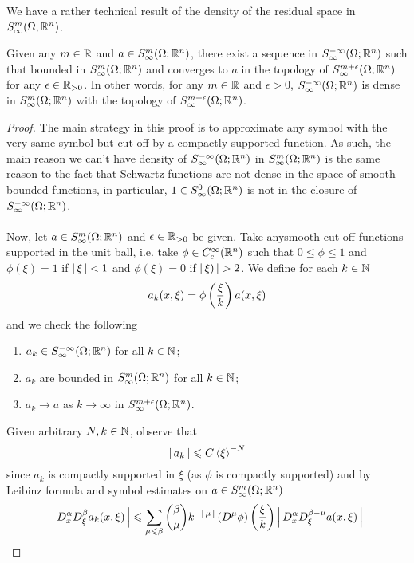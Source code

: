 \documentclass[12pt]{article}
\begin{document}
We have a rather technical result of the density of the residual space in $S^{m}_\infty(\Omega; \R^n)$. 
\begin{flemma}
    Given any $m \in \R$ and $a \in S^{m}_\infty(\Omega; \R^n)$, there exist a sequence in $S^{-\infty}_\infty(\Omega; \R^n)$ such that bounded in $S^{m}_\infty(\Omega; \R^n)$ and converges to $a$ in the topology of $S^{m + \epsilon}_\infty(\Omega; \R^n)$ for any $\epsilon \in \R_{> 0}$. In other words, for any $m \in \R$ and $\epsilon > 0$, $S^{-\infty}_\infty(\Omega; \R^n)$ is dense in $S^{m}_\infty(\Omega; \R^n)$ with the topology of $S^{m + \epsilon}_\infty(\Omega; \R^n)$.
\end{flemma}
\begin{proof}
    The main strategy in this proof is to approximate any symbol with the very same symbol but cut off by a compactly supported function. As such, the main reason we can't have density of $S^{-\infty}_\infty(\Omega; \R^n)$ in $S^m_\infty(\Omega; \R^n)$ is the same reason to the fact that Schwartz functions are not dense in the space of smooth bounded functions, in particular, $1 \in S^0_\infty(\Omega; \R^n)$ is not in the closure of $S^{-\infty}_\infty(\Omega; \R^n)$. \\
    \\
    Now, let $a \in S^{m}_\infty(\Omega; \R^n)$ and $\epsilon \in \R_{>0}$ be given. Take anysmooth cut off functions supported in the unit ball, i.e. take $\phi \in C^\infty_c(\R^n)$ such that $0 \leq \phi \leq 1$ and $\phi(\xi) = 1 $ if $\abs{\xi} < 1$ and $\phi(\xi) = 0$ if $\abs{\xi)} > 2$. We define for each $k \in \N$
    \[
    a_k(x, \xi) = \phi\brac{\frac{\xi}{k}} a (x, \xi)
    \]
    and we check the following 
    \begin{enumerate}
        \item $a_k \in S^{-\infty}_\infty(\Omega; \R^n)$ for all $k \in \N$; 
        \item $a_k$ are bounded in $S^{m}_\infty(\Omega; \R^n)$ for all $k \in \N$; 
        \item $a_k \to a$ as $k \to \infty$ in $S^{m + \epsilon}_\infty(\Omega; \R^n)$. 
    \end{enumerate}
     Given arbitrary $N, k \in \N$, observe that 
     \[
     \abs{a_k} \leq C \sym[\xi]^{-N} 
     \]
     since $a_k$ is compactly supported in $\xi$ (as $\phi$ is compactly supported) and by Leibinz formula and symbol estimates on $a \in S^{m}_\infty(\Omega; \R^n)$
     \[
     \abs{D^\alpha_x D^\beta_\xi a_k(x, \xi)} 
     \leq \sum_{\mu \leq \beta} \binom{\beta}{\mu}k^{-\abs{\mu}} \brac{D^\mu \phi}\brac{\frac{\xi}{k}} \abs{D^\alpha_x D^{\beta - \mu}_\xi a(x, \xi) } 
\]
\end{proof}
\end{document}
